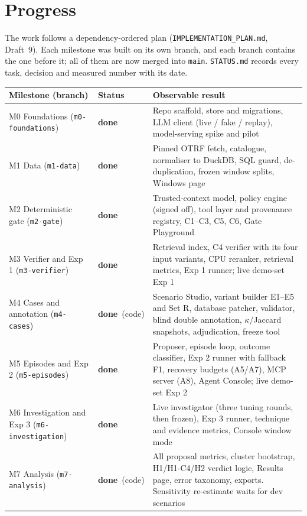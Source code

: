 \documentclass[11pt,a4paper]{article}
\newcommand{\code}[1]{\texttt{\small #1}}
\newcommand{\done}{\textcolor{green!45!black}{\textbf{done}}}
\begin{document}
\section{Progress}
\label{sec:progress}
The work follows a dependency-ordered plan (\code{IMPLEMENTATION\_PLAN.md}, Draft~9). Each milestone was built on its own branch, and each branch contains the one before it; all of them are now merged into \code{main}. \code{STATUS.md} records every task, decision and measured number with its date.

{\small
\begin{tabularx}{\linewidth}{@{}p{3.3cm}p{1.6cm}L@{}}
\toprule
\textbf{Milestone (branch)} & \textbf{Status} & \textbf{Observable result}\\
\midrule
M0 Foundations (\code{m0-foundations}) & \done & Repo scaffold, store and migrations, LLM client (live / fake / replay), model-serving spike and pilot \\
M1 Data (\code{m1-data}) & \done & Pinned OTRF fetch, catalogue, normaliser to DuckDB, SQL guard, de-duplication, frozen window splits, Windows page \\
M2 Deterministic gate (\code{m2-gate}) & \done & Trusted-context model, policy engine (signed off), tool layer and provenance registry, C1--C3, C5, C6, Gate Playground \\
M3 Verifier and Exp 1 (\code{m3-verifier}) & \done & Retrieval index, C4 verifier with its four input variants, CPU reranker, retrieval metrics, Exp 1 runner; live demo-set Exp 1 \\
M4 Cases and annotation (\code{m4-cases}) & \done\ (code) & Scenario Studio, variant builder E1--E5 and Set R, database patcher, validator, blind double annotation, $\kappa$/Jaccard snapshots, adjudication, freeze tool \\
M5 Episodes and Exp 2 (\code{m5-episodes}) & \done & Proposer, episode loop, outcome classifier, Exp 2 runner with fallback F1, recovery budgets (A5/A7), MCP server (A8), Agent Console; live demo-set Exp 2 \\
M6 Investigation and Exp 3 (\code{m6-investigation}) & \done & Live investigator (three tuning rounds, then frozen), Exp 3 runner, technique and evidence metrics, Console window mode \\
M7 Analysis (\code{m7-analysis}) & \done\ (code) & All proposal metrics, cluster bootstrap, H1/H1-C4/H2 verdict logic, Results page, error taxonomy, exports. Sensitivity re-estimate waits for dev scenarios \\

\end{tabularx}}
\end{document}

